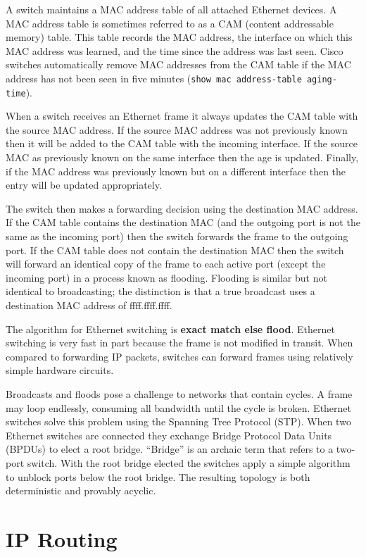 \documentclass{book}
\begin{document}
A switch maintains a MAC address table of all attached Ethernet devices. A MAC address table is sometimes referred to as a CAM (content addressable memory) table. This table records the MAC address, the interface on which this MAC address was learned, and the time since the address was last seen. Cisco switches automatically remove MAC addresses from the CAM table if the MAC address has not been seen in five minutes (\texttt{show mac address-table aging-time}).

When a switch receives an Ethernet frame it always updates the CAM table with the source MAC address. If the source MAC address was not previously known then it will be added to the CAM table with the incoming interface. If the source MAC as previously known on the same interface then the age is updated. Finally, if the MAC address was previously known but on a different interface then the entry will be updated appropriately.

The switch then makes a forwarding decision using the destination MAC address. If the CAM table contains the destination MAC (and the outgoing port is not the same as the incoming port) then the switch forwards the frame to the outgoing port. If the CAM table does not contain the destination MAC then the switch will forward an identical copy of the frame to each active port (except the incoming port) in a process known as flooding. Flooding is similar but not identical to broadcasting; the distinction is that a true broadcast uses a destination MAC address of ffff.ffff.ffff.

The algorithm for Ethernet switching is \textbf{exact match else flood}. Ethernet switching is very fast in part because the frame is not modified in transit. When compared to forwarding IP packets, switches can forward frames using relatively simple hardware circuits.

Broadcasts and floods pose a challenge to networks that contain cycles. A frame may loop endlessly, consuming all bandwidth until the cycle is broken. Ethernet switches solve this problem using the Spanning Tree Protocol (STP). When two Ethernet switches are connected they exchange Bridge Protocol Data Units (BPDUs) to elect a root bridge. ``Bridge'' is an archaic term that refers to a two-port switch. With the root bridge elected the switches apply a simple algorithm to unblock ports below the root bridge. The resulting topology is both deterministic and provably acyclic.

\section{IP Routing}
\end{document}
